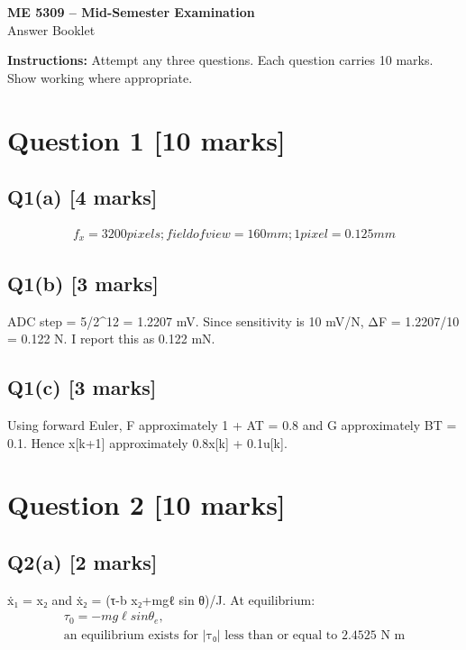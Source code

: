 \documentclass[11pt,a4paper]{article}
\begin{document}
\begin{center}
{\Large\bfseries ME 5309 -- Mid-Semester Examination}\\[3pt]
{\large Answer Booklet}\\[8pt]
\end{center}
\textbf{Instructions:} Attempt any three questions. Each question carries 10 marks. Show working where appropriate.
\section*{Question 1 \hfill [10 marks]}
\subsection*{Q1(a) \hfill [4 marks]}

\[\begin{aligned}f_x = 3200 pixels; field of view = 160 mm; 1 pixel = 0.125 mm\end{aligned}\]

\subsection*{Q1(b) \hfill [3 marks]}

ADC step = 5/2\textasciicircum{}12 = 1.2207 mV.
Since sensitivity is 10 mV/N, ΔF = 1.2207/10 = 0.122 N.
I report this as 0.122 mN.

\subsection*{Q1(c) \hfill [3 marks]}

Using forward Euler, F approximately 1 + AT = 0.8 and G approximately BT = 0.1.
Hence x[k+1] approximately 0.8x[k] + 0.1u[k].

\section*{Question 2 \hfill [10 marks]}
\subsection*{Q2(a) \hfill [2 marks]}

ẋ₁ = x₂ and ẋ₂ = (τ-b x₂+mgℓ sin θ)/J.
At equilibrium:\[\begin{aligned}τ_0 = -mg\ell sin \theta_e,\\ \text{an equilibrium exists for |τ₀| less than or equal to 2.4525 N m}\end{aligned}\]
\end{document}
